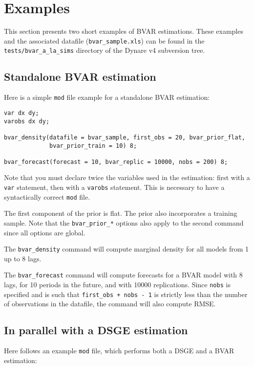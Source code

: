 \documentclass[10pt,a4paper]{article}
\begin{document}
\section{Examples}

This section presents two short examples of BVAR estimations. These examples and the associated datafile (\texttt{bvar\_sample.xls}) can be found in the \texttt{tests/bvar\_a\_la\_sims} directory of the Dynare v4 subversion tree.

\subsection{Standalone BVAR estimation}

Here is a simple \texttt{mod} file example for a standalone BVAR estimation:

\begin{verbatim}
var dx dy;
varobs dx dy;

bvar_density(datafile = bvar_sample, first_obs = 20, bvar_prior_flat,
             bvar_prior_train = 10) 8;

bvar_forecast(forecast = 10, bvar_replic = 10000, nobs = 200) 8;
\end{verbatim}

Note that you must declare twice the variables used in the estimation: first with a \texttt{var} statement, then with a \texttt{varobs} statement. This is necessary to have a syntactically correct \texttt{mod} file.

The first component of the prior is flat. The prior also incorporates a training sample. Note that the \texttt{bvar\_prior\_*} options also apply to the second command since all options are global.

The \texttt{bvar\_density} command will compute marginal density for all models from 1 up to 8 lags.

The \texttt{bvar\_forecast} command will compute forecasts for a BVAR model with 8 lags, for 10 periods in the future, and with 10000 replications. Since \texttt{nobs} is specified and is such that \texttt{first\_obs + nobs - 1} is strictly less than the number of observations in the datafile, the command will also compute RMSE.

\subsection{In parallel with a DSGE estimation}

Here follows an example \texttt{mod} file, which performs both a DSGE and a BVAR estimation:
\end{document}
